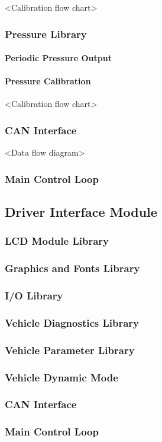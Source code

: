 <Calibration flow chart>


\subsubsection{Pressure Library}


\paragraph{Periodic Pressure Output}


\paragraph{Pressure Calibration}

<Calibration flow chart>


\subsubsection{CAN Interface}

<Data flow diagram>


\subsubsection{Main Control Loop}





\subsection{Driver Interface Module}


\subsubsection{LCD Module Library}


\subsubsection{Graphics and Fonts Library}


\subsubsection{I/O Library}


\subsubsection{Vehicle Diagnostics Library}


\subsubsection{Vehicle Parameter Library}


\subsubsection{Vehicle Dynamic Mode}


\subsubsection{CAN Interface}


\subsubsection{Main Control Loop}